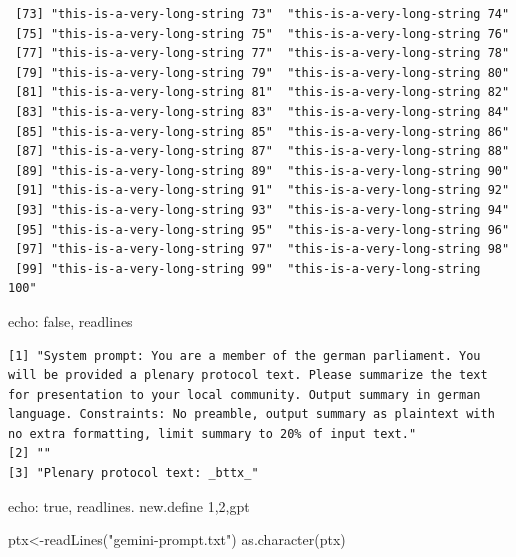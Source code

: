 \documentclass[
  letterpaper,
  DIV=11,
  numbers=noendperiod]{scrartcl}
\newenvironment{Shaded}{\begin{snugshade}}{\end{snugshade}}
\newcommand{\FunctionTok}[1]{\textcolor[rgb]{0.28,0.35,0.67}{#1}}
\newcommand{\NormalTok}[1]{\textcolor[rgb]{0.00,0.23,0.31}{#1}}
\newcommand{\OtherTok}[1]{\textcolor[rgb]{0.00,0.23,0.31}{#1}}
\newcommand{\StringTok}[1]{\textcolor[rgb]{0.13,0.47,0.30}{#1}}
\begin{document}
\begin{verbatim}
 [73] "this-is-a-very-long-string 73"  "this-is-a-very-long-string 74" 
 [75] "this-is-a-very-long-string 75"  "this-is-a-very-long-string 76" 
 [77] "this-is-a-very-long-string 77"  "this-is-a-very-long-string 78" 
 [79] "this-is-a-very-long-string 79"  "this-is-a-very-long-string 80" 
 [81] "this-is-a-very-long-string 81"  "this-is-a-very-long-string 82" 
 [83] "this-is-a-very-long-string 83"  "this-is-a-very-long-string 84" 
 [85] "this-is-a-very-long-string 85"  "this-is-a-very-long-string 86" 
 [87] "this-is-a-very-long-string 87"  "this-is-a-very-long-string 88" 
 [89] "this-is-a-very-long-string 89"  "this-is-a-very-long-string 90" 
 [91] "this-is-a-very-long-string 91"  "this-is-a-very-long-string 92" 
 [93] "this-is-a-very-long-string 93"  "this-is-a-very-long-string 94" 
 [95] "this-is-a-very-long-string 95"  "this-is-a-very-long-string 96" 
 [97] "this-is-a-very-long-string 97"  "this-is-a-very-long-string 98" 
 [99] "this-is-a-very-long-string 99"  "this-is-a-very-long-string 100"
\end{verbatim}

echo: false, readlines

\begin{verbatim}
[1] "System prompt: You are a member of the german parliament. You will be provided a plenary protocol text. Please summarize the text for presentation to your local community. Output summary in german language. Constraints: No preamble, output summary as plaintext with no extra formatting, limit summary to 20% of input text."
[2] ""                                                                                                                                                                                                                                                                                                                                  
[3] "Plenary protocol text: _bttx_"                                                                                                                                                                                                                                                                                                     
\end{verbatim}

echo: true, readlines. new.define 1,2,gpt

\begin{Shaded}
\begin{Highlighting}[]
\NormalTok{ptx}\OtherTok{\textless{}{-}}\FunctionTok{readLines}\NormalTok{(}\StringTok{"gemini{-}prompt.txt"}\NormalTok{)}
\FunctionTok{as.character}\NormalTok{(ptx)}
\end{Highlighting}
\end{Shaded}
\end{document}

